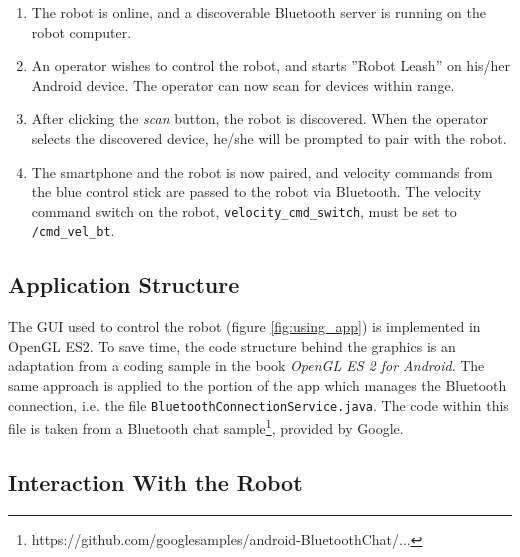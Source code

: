 \begin{enumerate}
	\item The robot is online, and a discoverable Bluetooth server is running on the robot computer.
	\item An operator wishes to control the robot, and starts ''Robot Leash'' on his/her Android device. The operator can now scan for devices within range.
	\item After clicking the \textit{scan} button, the robot is discovered. When the operator selects the discovered device, he/she will be prompted to pair with the robot.
	\item The smartphone and the robot is now paired, and velocity commands from the blue control stick are passed to the robot via Bluetooth. The velocity command switch on the robot, \texttt{velocity\_cmd\_switch}, must be set to \texttt{/cmd\_vel\_bt}.
\end{enumerate}




\subsection{Application Structure}


The \ac{GUI} used to control the robot (figure \ref{fig:using_app}) is implemented in OpenGL ES2. To save time, the code structure behind the graphics is an adaptation from a coding sample in the book \textit{OpenGL ES 2 for Android}\cite{brothaler2013opengl}. The same approach is applied to the portion of the app which manages the Bluetooth connection, i.e. the file \texttt{BluetoothConnectionService.java}. The code within this file is taken from a Bluetooth chat sample\footnote{https://github.com/googlesamples/android-BluetoothChat/...}, provided by Google. 

\subsection{Interaction With the Robot}

